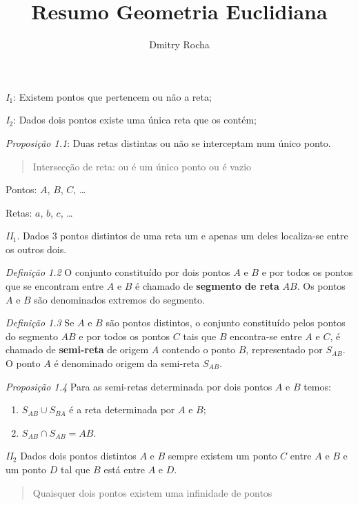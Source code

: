 \documentclass[11pt]{article}
\author{Dmitry Rocha}
\title{Resumo Geometria Euclidiana}
\begin{document}
\maketitle



\emph{I$_{1}$}: Existem pontos que pertencem ou não a reta;

\emph{I$_{2}$}: Dados dois pontos existe uma única reta que os contém;

\emph{Proposição 1.1}: Duas retas distintas ou não se interceptam num único
ponto.

\begin{quote}
  Intersecção de reta: ou é um único ponto ou é vazio
\end{quote}

Pontos: $A$, $B$, $C$, \ldots

Retas: $a$, $b$, $c$, \ldots


\emph{II$_{1}$}. Dados 3 pontos distintos de uma reta um e apenas um deles
localiza-se entre os outros dois.

\emph{Definição 1.2} O conjunto constituído por dois pontos $A$ e $B$ e por
todos os pontos que se encontram entre $A$ e $B$ é chamado de \textbf{segmento de
reta} $AB$. Os pontos $A$ e $B$ são denominados extremos do segmento.

\emph{Definição 1.3} Se $A$ e $B$ são pontos distintos, o conjunto
constituído pelos pontos do segmento $AB$ e por todos os pontos $C$ tais que
$B$ encontra-se entre $A$ e $C$, é chamado de \textbf{semi-reta} de origem $A$
contendo o ponto $B$, representado por $S_{AB}$. O ponto $A$ é denominado
origem da semi-reta $S_{AB}$.

\emph{Proposição 1.4} Para as semi-retas determinada por dois pontos $A$ e
$B$ temos:

\begin{enumerate} \itemsep1pt \parskip0pt 
\item $S_{AB} \cup S_{BA}$ é a reta determinada por $A$ e $B$;
\item $S_{AB} \cap S_{AB} = AB$.
\end{enumerate}

\emph{II$_{2}$} Dados dois pontos distintos $A$ e $B$ sempre existem um ponto $C$
entre $A$ e $B$ e um ponto $D$ tal que $B$ está entre $A$ e $D$.

\begin{quote}
  Quaisquer dois pontos existem uma infinidade de pontos
\end{quote}
\end{document}
